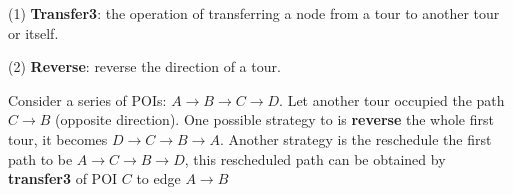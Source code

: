(1) \textbf{Transfer3}: the operation of transferring a node from a tour to another tour or itself.

(2) \textbf{Reverse}: reverse the direction of a tour.

Consider a series of POIs: $A \to B \to C \to D$. Let another tour occupied the path $C \to B$ (opposite direction). One possible strategy to is \textbf{reverse} the whole first tour, it becomes $D \to C \to B \to A$. Another strategy is the reschedule the first path to be $A \to C \to B \to D$, this rescheduled path can be obtained by \textbf{transfer3} of POI $C$ to edge $A \to B$